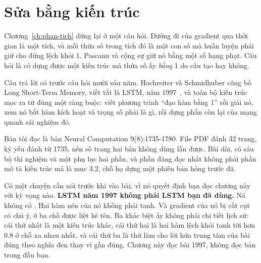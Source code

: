 \chapter{Sửa bằng kiến trúc}
\label{ch:lstm}

Chương~\ref{ch:phan-tich} dừng lại ở một câu hỏi. Đường đi của gradient qua thời
gian là một tích, và mỗi thừa số trong tích đó là một con số mà huấn luyện phải
giữ cho đừng lệch khỏi 1. Pascanu và cộng sự giữ nó bằng một số hạng phạt.
Câu hỏi là có dựng được một kiến trúc mà thừa số ấy \emph{bằng} 1 do cấu tạo
hay không.

Câu trả lời có trước câu hỏi mười sáu năm. Hochreiter và Schmidhuber công bố
Long Short-Term Memory, viết tắt là LSTM, năm 1997~\autocite{hochreiter1997lstm},
và toàn bộ kiến trúc mọc ra từ đúng một ràng buộc: viết phương trình
\enquote{đạo hàm bằng 1} rồi giải nó, xem nó bắt hàm kích hoạt và trọng số phải
là gì, rồi dựng phần còn lại của mạng quanh cái nghiệm đó.

Bản tôi đọc là bản Neural Computation 9(8):1735-1780. File PDF đánh 32 trang,
kỷ yếu đánh từ 1735, nên số trang hai bản không dùng lẫn được. Bài dài, có sáu
bộ thí nghiệm và một phụ lục hai phần, và phần đáng đọc nhất không phải phần mô
tả kiến trúc mà là mục 3.2, chỗ họ dựng một phiên bản hỏng trước đã.

Có một chuyện cần nói trước khi vào bài, vì nó quyết định bạn đọc chương này
với kỳ vọng nào. \textbf{LSTM năm 1997 không phải LSTM bạn đã dùng.} Nó không
có . Hai hàm nén của nó không phải tanh. Và gradient
của nó bị cắt cụt có chủ ý, ở ba chỗ được liệt kê tên. Ba khác biệt ấy không
phải chi tiết lịch sử: cái thứ nhất là một kiến trúc khác, cái thứ hai là hai
hàm lệch khỏi tanh tới hơn 0.8 ở chỗ xa nhau nhất, và cái thứ ba là thứ làm cho
lời hứa trung tâm của bài đúng theo nghĩa đen thay vì gần đúng. Chương này đọc
bài 1997, không đọc bản trong đầu bạn.









